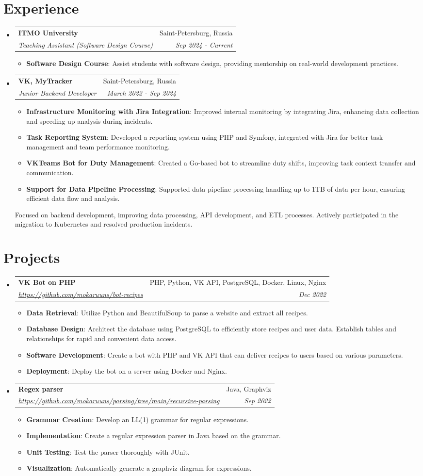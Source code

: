 \documentclass[letterpaper,10.8pt]{article}
\makeatletter
\newcommand{\resumeItem}[2]{
    \item\small{
        \textbf{#1}{: #2 \vspace{-2pt}}
    }
}
\newcommand{\resumeSubheading}[4]{
    \vspace{-1pt}\item
    \begin{tabular*}{0.97\textwidth}{l@{\extracolsep{\fill}}r}
        \textbf{#1}       & #2                 \\
        \textit{\small#3} & \textit{\small #4} \\
    \end{tabular*}\vspace{-5pt}
}
\newcommand{\resumeSubHeadingListStart}{\begin{itemize}[leftmargin=*]}
\newcommand{\resumeSubHeadingListEnd}{\end{itemize}}
\newcommand{\resumeItemListStart}{\begin{itemize}}
\newcommand{\resumeItemListEnd}{\end{itemize}\vspace{-5pt}}
\makeatother
\begin{document}
\section{Experience}
\resumeSubHeadingListStart

\resumeSubheading
{ITMO University}{Saint-Petersburg, Russia}
{Teaching Assistant (Software Design Course)}{Sep 2024 - Current}
\resumeItemListStart
\resumeItem{Software Design Course}{Assist students with software design, providing mentorship on real-world development practices.}
\resumeItemListEnd

\resumeSubheading
{VK, MyTracker}{Saint-Petersburg, Russia}
{Junior Backend Developer}{March 2022 - Sep 2024}
\resumeItemListStart
\resumeItem{Infrastructure Monitoring with Jira Integration}
{Improved internal monitoring by integrating Jira, enhancing data collection and speeding up analysis during incidents.}
\resumeItem{Task Reporting System}
{Developed a reporting system using PHP and Symfony, integrated with Jira for better task management and team performance monitoring.}
\resumeItem{VKTeams Bot for Duty Management}
{Created a Go-based bot to streamline duty shifts, improving task context transfer and communication.}
\resumeItem{Support for Data Pipeline Processing}
{Supported data pipeline processing handling up to 1TB of data per hour, ensuring efficient data flow and analysis.}
\resumeItemListEnd
{Focused on backend development, improving data processing, API development, and ETL processes. Actively participated in the migration to Kubernetes and resolved production incidents.}

\resumeSubHeadingListEnd

\section{Projects}
\resumeSubHeadingListStart
\resumeSubheading
{VK Bot on PHP} {PHP, Python, VK API, PostgreSQL, Docker, Linux, Nginx}
{\href{https://github.com/mokaruuns/bot-recipes}{https://github.com/mokaruuns/bot-recipes}}{Dec 2022}
\resumeItemListStart
\resumeItem{Data Retrieval}{Utilize Python and BeautifulSoup to parse a website and extract all recipes.}
\resumeItem{Database Design}{Architect the database using PostgreSQL to efficiently store recipes and user data. Establish tables and relationships for rapid and convenient data access.}
\resumeItem{Software Development}{Create a bot with PHP and VK API that can deliver recipes to users based on various parameters.}
\resumeItem{Deployment}{Deploy the bot on a server using Docker and Nginx.}
\resumeItemListEnd

\resumeSubheading
{Regex parser} {Java, Graphviz}
{\href{https://github.com/mokaruuns/parsing/tree/main/recursive-parsing}{https://github.com/mokaruuns/parsing/tree/main/recursive-parsing}}{Sep 2022}
\resumeItemListStart
\resumeItem{Grammar Creation}{Develop an LL(1) grammar for regular expressions.}
\resumeItem{Implementation}{Create a regular expression parser in Java based on the grammar.}
\resumeItem{Unit Testing}{Test the parser thoroughly with JUnit.}
\resumeItem{Visualization}{Automatically generate a graphviz diagram for expressions.}
\resumeItemListEnd

\resumeSubHeadingListEnd
\end{document}
